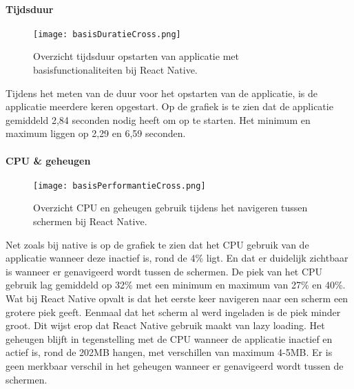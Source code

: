 \paragraph{Tijdsduur}
\begin{figure}[H]
    \centering
    \texttt{[image: basisDuratieCross.png]}
    \caption{Overzicht tijdsduur opstarten van applicatie met basisfunctionaliteiten bij React Native.}
\end{figure}
Tijdens het meten van de duur voor het opstarten van de applicatie, 
is de applicatie meerdere keren opgestart. Op de grafiek is te zien dat de applicatie
gemiddeld 2,84 seconden nodig heeft om op te starten. Het minimum en maximum
liggen op 2,29 en 6,59 seconden.

\paragraph{CPU \& geheugen}
\begin{figure}[H]
    \centering
    \texttt{[image: basisPerformantieCross.png]}
    \caption{Overzicht CPU en geheugen gebruik tijdens het navigeren tussen schermen bij React Native.}
\end{figure}
Net zoals bij native is op de grafiek te zien dat het CPU gebruik van de applicatie wanneer deze
inactief is, rond de 4\% ligt. En dat er duidelijk zichtbaar is wanneer er
genavigeerd wordt tussen de schermen. De piek van het CPU gebruik lag gemiddeld
op 32\% met een minimum en maximum van 27\% en 40\%. Wat bij React Native opvalt is dat
het eerste keer navigeren naar een scherm een grotere piek geeft. Eenmaal dat het scherm 
al werd ingeladen is de piek minder groot. Dit wijst erop dat React Native gebruik maakt van
lazy loading. Het geheugen blijft in tegenstelling
met de CPU wanneer de applicatie inactief en actief is, rond de 202MB hangen, met
verschillen van maximum 4-5MB. Er is geen merkbaar verschil in het geheugen wanneer
er genavigeerd wordt tussen de schermen.
